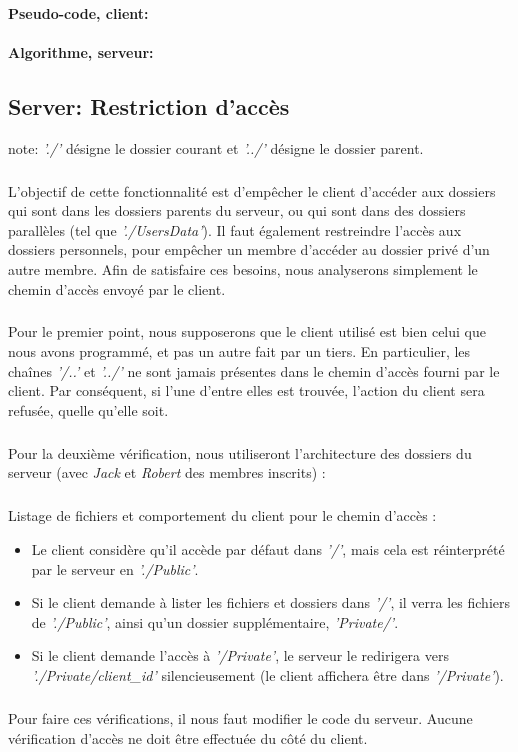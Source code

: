 \documentclass[12pt,a4paper,twoside]{article}
\begin{document}
			\paragraph*{Pseudo-code, client:}
				
			\paragraph*{Algorithme, serveur:}
				
				
		\subsection{Server: Restriction d'accès} %
			note: \textit{'./'} désigne le dossier courant et \textit{'../'} désigne le dossier parent.
			\subparagraph*{}
				L'objectif de cette fonctionnalité est d'empêcher le client d'accéder aux dossiers qui sont dans les dossiers parents du serveur, ou qui sont dans des dossiers parallèles (tel que \textit{'./UsersData'}). Il faut également restreindre l'accès aux dossiers personnels, pour empêcher un membre d'accéder au dossier privé d'un autre membre.
				Afin de satisfaire ces besoins, nous analyserons simplement le chemin d'accès envoyé par le client.
			\subparagraph*{}
				Pour le premier point, nous supposerons que le client utilisé est bien celui que nous avons programmé, et pas un autre fait par un tiers. En particulier, les chaînes \textit{'/..'} et \textit{'../'} ne sont jamais présentes dans le chemin d'accès fourni par le client. Par  conséquent, si l'une d'entre elles est trouvée, l'action du client sera refusée, quelle qu'elle soit.
			\subparagraph*{}
				Pour la deuxième vérification, nous utiliseront l'architecture des dossiers du serveur (avec \textit{Jack} et \textit{Robert} des membres inscrits) :
				\begin{samepage}
					
				\end{samepage}
			\subparagraph*{}
				Listage de fichiers et comportement du client pour le chemin d'accès :
				\begin{itemize}
					\item{} Le client considère qu'il accède par défaut dans \textit{'/'}, mais cela est réinterprété par le serveur en \textit{'./Public'}.
					\item{} Si le client demande à lister les fichiers et dossiers dans \textit{'/'}, il verra les fichiers de \textit{'./Public'}, ainsi qu'un dossier supplémentaire, \textit{'Private/'}.
					\item{} Si le client demande l'accès à \textit{'/Private'}, le serveur le redirigera vers \textit{'./Private/client\_id'} silencieusement (le client affichera être dans \textit{'/Private'}).
				 \end{itemize}
			\subparagraph*{}
				Pour faire ces vérifications, il nous faut modifier le code du serveur. Aucune vérification d'accès ne doit être effectuée du côté du client.
\end{document}
